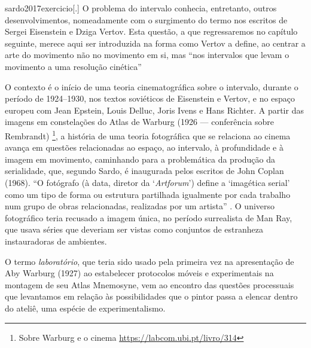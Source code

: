 \begin{displaycquote}[232]{sardo2017exercicio}[.]
	O problema do intervalo conhecia, entretanto, outros desenvolvimentos,
	nomeadamente com o surgimento do termo nos escritos de Sergei Eisenstein
	e Dziga Vertov. Esta questão, a que regressaremos no capítulo seguinte,
	merece aqui ser introduzida na forma como Vertov a define, ao centrar a
	arte do movimento não no movimento em si, mas \enquote{nos intervalos que levam
		o movimento a uma resolução cinética}
\end{displaycquote}

O contexto é o início de uma teoria cinematográfica sobre o intervalo,
durante o período de 1924--1930, nos textos soviéticos de Eisenstein e
Vertov, e no espaço europeu com Jean Epstein, Louis Delluc, Joris Ivens
e Hans Richter. A partir das imagens em constelações do Atlas de
Warburg (1926 --- conferência sobre Rembrandt) \footnote{Sobre Warburg
	e o cinema \url{https://labcom.ubi.pt/livro/314}}, a história de uma
teoria fotográfica que se relaciona ao cinema avança em questões
relacionadas ao espaço, ao intervalo, à profundidade e à imagem em
movimento, caminhando para a problemática da produção da serialidade,
que, segundo Sardo, é inaugurada pelos escritos de John Coplan (1968).
\enquote{O fotógrafo (à data, diretor da \enquote{\emph{Artforum}})
	define a \enquote{imagética serial} como um tipo de forma ou estrutura
	partilhada igualmente por cada trabalho num grupo de obras
	relacionadas, realizadas por um artista}
\parencite[233]{sardo2017exercicio}. O universo fotográfico teria recusado
a imagem única, no período surrealista de Man Ray, que usava séries que
deveriam ser vistas como conjuntos de estranheza instauradoras de
ambientes.


O termo \emph{laboratório}, que teria sido usado pela primeira vez na
apresentação de Aby Warburg (1927) ao estabelecer protocolos móveis e
experimentais na montagem de seu Atlas Mnemosyne, vem ao encontro das
questões processuais que levantamos em relação às possibilidades que o
pintor passa a elencar dentro do ateliê, uma espécie de
experimentalismo.

